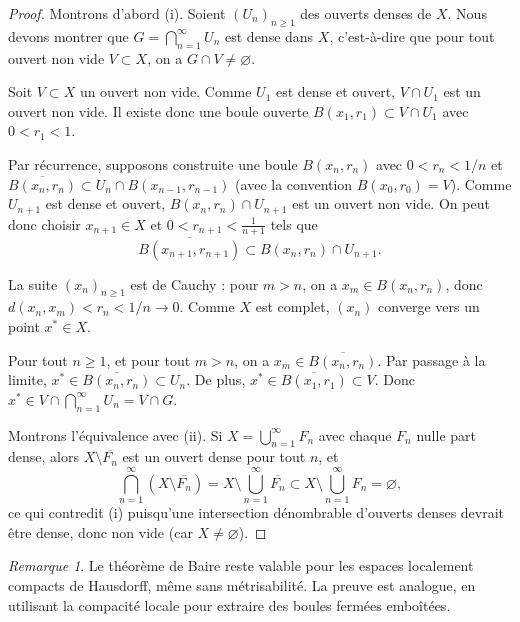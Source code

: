 \documentclass[a4paper,12pt]{book}
\theoremstyle{definition}
\theoremstyle{plain}
\theoremstyle{remark}
\newtheorem{remarque}[definition]{Remarque}
\begin{document}
\begin{proof}
Montrons d'abord (i). Soient $(U_n)_{n \geq 1}$ des ouverts denses de $X$.
Nous devons montrer que $G = \bigcap_{n=1}^{\infty} U_n$ est dense dans $X$,
c'est-à-dire que pour tout ouvert non vide $V \subset X$, on a $G \cap V \neq \varnothing$.

Soit $V \subset X$ un ouvert non vide. Comme $U_1$ est dense et ouvert,
$V \cap U_1$ est un ouvert non vide. Il existe donc une boule ouverte
$B(x_1, r_1) \subset V \cap U_1$ avec $0 < r_1 < 1$.

Par récurrence, supposons construite une boule $B(x_n, r_n)$ avec $0 < r_n < 1/n$
et $\overline{B(x_n, r_n)} \subset U_n \cap B(x_{n-1}, r_{n-1})$ (avec la convention
$B(x_0, r_0) = V$). Comme $U_{n+1}$ est dense et ouvert, $B(x_n, r_n) \cap U_{n+1}$
est un ouvert non vide. On peut donc choisir $x_{n+1} \in X$ et $0 < r_{n+1} < \frac{1}{n+1}$
tels que
\[
  \overline{B(x_{n+1}, r_{n+1})} \subset B(x_n, r_n) \cap U_{n+1}.
\]

La suite $(x_n)_{n \geq 1}$ est de Cauchy : pour $m > n$, on a
$x_m \in B(x_n, r_n)$, donc $d(x_n, x_m) < r_n < 1/n \to 0$. Comme $X$ est complet,
$(x_n)$ converge vers un point $x^* \in X$.

Pour tout $n \geq 1$, et pour tout $m > n$, on a $x_m \in \overline{B(x_n, r_n)}$.
Par passage à la limite, $x^* \in \overline{B(x_n, r_n)} \subset U_n$. De plus,
$x^* \in \overline{B(x_1, r_1)} \subset V$. Donc $x^* \in V \cap \bigcap_{n=1}^{\infty} U_n = V \cap G$.

Montrons l'équivalence avec (ii). Si $X = \bigcup_{n=1}^{\infty} F_n$ avec chaque $F_n$
nulle part dense, alors $X \setminus \overline{F_n}$ est un ouvert dense pour tout $n$, et
\[
  \bigcap_{n=1}^{\infty} (X \setminus \overline{F_n})
  = X \setminus \bigcup_{n=1}^{\infty} \overline{F_n}
  \subset X \setminus \bigcup_{n=1}^{\infty} F_n = \varnothing,
\]
ce qui contredit (i) puisqu'une intersection dénombrable d'ouverts denses
devrait être dense, donc non vide (car $X \neq \varnothing$).
\end{proof}

\begin{remarque}
\label{rem:baire-localement-compact}
Le théorème de Baire reste valable pour les espaces localement compacts
de Hausdorff, même sans
métrisabilité. La preuve est analogue, en utilisant la compacité locale
pour extraire des boules fermées emboîtées.
\end{remarque}
\end{document}
